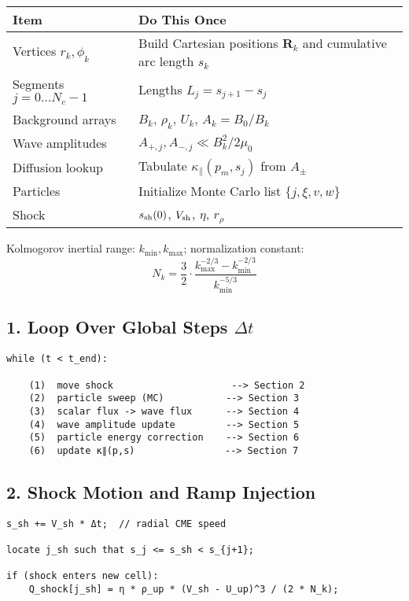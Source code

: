 \begin{tabular}{|p{6.5cm}|p{8.3cm}|}
\hline
\textbf{Item} & \textbf{Do This Once} \\
\hline
Vertices $r_k,\phi_k$ & Build Cartesian positions $\mathbf{R}_k$ and cumulative arc length $s_k$ \\
Segments $j = 0 \dots N_c - 1$ & Lengths $L_j = s_{j+1} - s_j$ \\
Background arrays & $B_k$, $\rho_k$, $U_k$, $A_k = B_0 / B_k$ \\
Wave amplitudes & $A_{+,j}, A_{-,j} \ll B_k^2 / 2\mu_0$ \\
Diffusion lookup & Tabulate $\kappa_\parallel(p_m, s_j)$ from $A_\pm$ \\
Particles & Initialize Monte Carlo list $\{j, \xi, v, w\}$ \\
Shock & $s_{\rm sh}(0)$, $V_{\rm sh}$, $\eta$, $r_\rho$ \\
\hline
\end{tabular}

\vspace{1em}
Kolmogorov inertial range: $k_{\min}, k_{\max}$;  
normalization constant:
\[
N_k = \frac{3}{2} \cdot \frac{k_{\max}^{-2/3} - k_{\min}^{-2/3}}{k_{\min}^{-5/3}}
\]

\subsection*{1. Loop Over Global Steps $\Delta t$}

\begin{lstlisting}
while (t < t_end):

    (1)  move shock                     --> Section 2
    (2)  particle sweep (MC)           --> Section 3
    (3)  scalar flux -> wave flux      --> Section 4
    (4)  wave amplitude update         --> Section 5
    (5)  particle energy correction    --> Section 6
    (6)  update κ∥(p,s)                --> Section 7
\end{lstlisting}

\subsection*{2. Shock Motion and Ramp Injection}

\begin{lstlisting}
s_sh += V_sh * Δt;  // radial CME speed

locate j_sh such that s_j <= s_sh < s_{j+1};

if (shock enters new cell):
    Q_shock[j_sh] = η * ρ_up * (V_sh - U_up)^3 / (2 * N_k);
\end{lstlisting}

